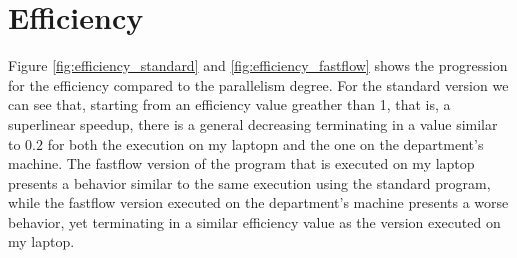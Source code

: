     \section{Efficiency} %
    \label{sec:efficiency}
        Figure \ref{fig:efficiency_standard} and \ref{fig:efficiency_fastflow} shows the progression for the
        efficiency compared to the parallelism degree. For the standard version we can see that, starting from
        an efficiency value greather than 1, that is, a superlinear speedup, there is a general decreasing
        terminating in a value similar to $0.2$ for both the execution on my laptopn and the one on the
        department's machine. The fastflow version of the program that is executed on my laptop presents a
        behavior similar to the same execution using the standard program, while the fastflow version executed
        on the department's machine presents a worse behavior, yet terminating in a similar efficiency value as
        the version executed on my laptop.
